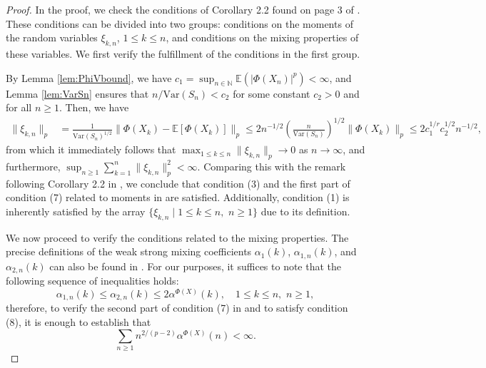 \documentclass[a4paper,10pt]{article}
\newcommand{\N}{\mathbb{N}}
\newcommand{\E}{\mathbb{E}}
\newcommand{\var}{\mathrm{Var}}
\begin{document}
\begin{proof}
	
	In the proof, we check the conditions of Corollary 2.2 found on page 3 of \cite{merlevede2020functional}. These conditions can be divided into two groups: conditions on the moments of the random variables $\xi_{k,n}$, $1 \leq k \leq n$, and conditions on the mixing properties of these variables. We first verify the fulfillment of the conditions in the first group.
	
	By Lemma \ref{lem:PhiVbound}, we have $c_1 = \sup_{n\in\N} \E (|\Phi(X_n)|^p) < \infty$, and Lemma \ref{lem:VarSn} ensures that $n/\var(S_n) < c_2$ for some constant $c_2 > 0$ and for all $n \geq 1$. Then, we have
	\begin{align*}
	\lVert \xi_{k,n}\rVert_p &= \frac{1}{\var(S_n)^{1/2}} \lVert \Phi(X_k) - \E[\Phi(X_k)] \rVert_p 
	\leq 
	2 n^{-1/2}\left(\frac{n}{\var(S_n)}\right)^{1/2}  \lVert \Phi(X_k) \rVert_p \leq 2 c_1^{1/r} c_2^{1/2} n^{-1/2},
	\end{align*}
	from which it immediately follows that $\max_{1 \leq k \leq n} \lVert \xi_{k,n} \rVert_p \to 0$ as $n \to \infty$, and furthermore, $\sup_{n \geq 1} \sum_{k=1}^{n} \lVert \xi_{k,n} \rVert_p^2 < \infty$.
	Comparing this with the remark following Corollary 2.2 in \cite{merlevede2020functional}, we conclude that condition (3) and the first part of condition (7) related to moments in \cite{merlevede2020functional} are satisfied. Additionally, condition (1) is inherently satisfied by the array $\{\xi_{k,n} \mid 1 \leq k \leq n,\,\, n \geq 1\}$ due to its definition.
	
	We now proceed to verify the conditions related to the mixing properties. The precise definitions of the weak strong mixing coefficients $\alpha_1(k)$, $\alpha_{1,n}(k)$, and $\alpha_{2,n}(k)$ can also be found in \cite{merlevede2020functional}. For our purposes, it suffices to note that the following sequence of inequalities holds:
	$$
	\alpha_{1,n}(k) \leq \alpha_{2,n}(k) \leq 2\alpha^{\Phi(X)}(k), \quad 1 \leq k \leq n, \,\, n \geq 1,
	$$
	therefore, to verify the second part of condition (7) in \cite{merlevede2020functional} and to satisfy condition (8), it is enough to establish that
	\begin{equation}\label{eq:ezkell}
	\sum_{n \geq 1} n^{2/(p-2)}\alpha^{\Phi(X)}(n) < \infty.	
	\end{equation}
	

\end{proof}
\end{document}
